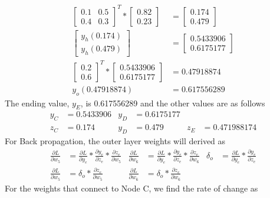 \documentclass[12pt,english]{article}
\begin{document}
\begin{align*}
\begin{bmatrix} 0.1 & 0.5 \\ 0.4 & 0.3 \end{bmatrix}^T * \begin{bmatrix} 0.82 \\ 0.23 \end{bmatrix}  &= \begin{bmatrix} 0.174 \\ 0.479 \end{bmatrix} \\
\begin{bmatrix} y_h(0.174) \\ y_h(0.479) \end{bmatrix} &= \begin{bmatrix} 0.5433906 \\ 0.6175177 \end{bmatrix} \\
\begin{bmatrix} 0.2 \\ 0.6 \end{bmatrix}^T * \begin{bmatrix} 0.5433906 \\ 0.6175177 \end{bmatrix} &=0.47918874\\
y_o(0.47918874) &= 0.617556289
\end{align*}
The ending value, $y_E$, is 0.617556289 and the other values are as follows\\
\begin{align*}
y_C &=0.5433906 & y_D&=0.6175177 \\
 z_C &=0.174 & y_D&=0.479 & z_E&=0.471988174
\end{align*}
For Back propagation, the outer layer weights will derived as
\begin{align*}
\frac{\partial L}{\partial w_5} &=\frac{\partial L}{\partial y_e} * \frac{\partial y_e}{\partial z_e} * \frac{\partial z_e}{\partial w_5} &
\frac{\partial L}{\partial w_6} &=\frac{\partial L}{\partial y_e} * \frac{\partial y_e}{\partial z_e} * \frac{\partial z_e}{\partial w_6} &
\delta_o &= \frac{\partial L}{\partial y_e} * \frac{\partial y_e}{\partial z_e}\\
\frac{\partial L}{\partial w_5} &= \delta_o * \frac{\partial z_e}{\partial w_5} &
\frac{\partial L}{\partial w_6} &= \delta_o * \frac{\partial z_e}{\partial w_6} &
\end{align*}
 For the weights that connect to Node C, we find the rate of change as
\end{document}
